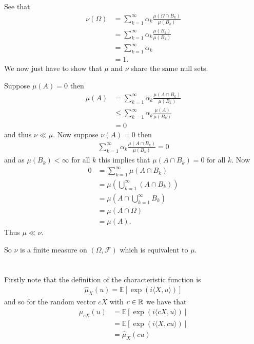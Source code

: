 \documentclass{unswmaths}
\begin{document}
See that
\begin{align}
	\nu(\Omega) &= \sum_{k=1}^\infty \alpha_k \frac{\mu(\Omega\cap B_k)}{\mu(B_k)} \\
	&= \sum_{k=1}^\infty \alpha_k \frac{\mu( B_k)}{\mu(B_k)} \\
	&= \sum_{k=1}^\infty \alpha_k \\
	&= 1.
\end{align}
We now just have to show that $ \mu $ and $ \nu $ share the same null sets. 

Suppose $ \mu(A) = 0 $ then
\begin{align}
	\mu(A) &= \sum_{k=1}^\infty \alpha_k \frac{\mu(A \cap B_k)}{\mu(B_k)} \\
		&\leq \sum_{k=1}^\infty \alpha_k \frac{\mu(A)}{\mu(B_k)} \\
		&= 0
\end{align}
and thus $ \nu \ll \mu $.
Now suppose $ \nu(A) =0 $ then
\begin{align}
	\sum_{k=1}^\infty \alpha_k \frac{\mu(A \cap B_k)}{\mu(B_k)} = 0
\end{align}
and as $ \mu(B_k) < \infty $ for all $ k $ this implies that $ \mu(A \cap B_k ) = 0$ for all $ k $. Now
\begin{align}
	0 &= \sum_{k=1}^\infty \mu(A \cap B_k) \\
		&= \mu\left( \bigcup_{k=1}^\infty (A \cap B_k) \right) \\
		&= \mu\left( A \cap \bigcup_{k=1}^\infty B_k\right) \\
		&= \mu(A \cap \Omega) \\
		&= \mu(A).
\end{align}
Thus $ \mu \ll \nu $.

So $ \nu $ is a finite measure on $ (\Omega, \mathcal{F}) $ which is equivalent to $ \mu $.
\section{}
\subsection{}
Firstly note that the definition of the characteristic function is
\begin{align}
	\hat{\mu}_X(u) = \mathbb{E}[\exp(i\langle X, u \rangle)]
\end{align}
and so for the random vector $ cX $ with $ c \in \mathbb{R} $ we have that
\begin{align}
	\hat{\mu}_{cX}(u) &= \mathbb{E}[ \exp(i \langle cX, u \rangle) ] \\
		 &= \mathbb{E}[ \exp(i \langle X, cu \rangle) ] \\
		 &= \hat{\mu}_{X}(cu)
\end{align}
\end{document}
